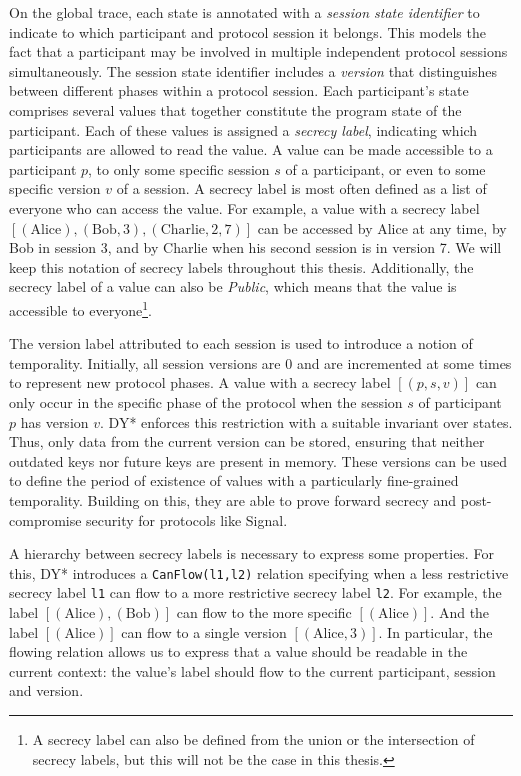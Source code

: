 On the global trace, each state is annotated with a \emph{session state identifier} to indicate to which participant and protocol session it belongs. This models the fact that a participant may be involved in multiple independent protocol sessions simultaneously. The session state identifier includes a \emph{version} that distinguishes between different phases within a protocol session.%
Each participant's state comprises several values that together constitute the program state of the participant. Each of these values is assigned a \emph{secrecy label}, indicating which participants are allowed to read the value.
A value can be made accessible to a participant $p$, to only some specific session $s$ of a participant, or even to some specific version $v$ of a session.
A secrecy label is most often defined as a list of everyone who can access the value. For example, a value with a secrecy label $[(\text{Alice}), (\text{Bob}, 3), (\text{Charlie}, 2, 7)]$ can be accessed by Alice at any time, by Bob in session 3, and by Charlie when his second session is in version 7. We will keep this notation of secrecy labels throughout this thesis.
Additionally, the secrecy label of a value can also be \emph{Public}, which means that the value is accessible to everyone\footnote{A secrecy label can also be defined from the union or the intersection of secrecy labels, but this will not be the case in this thesis.}.

The version label attributed to each session is used to introduce a notion of temporality. Initially, all session versions are 0 and are incremented at some times to represent new protocol phases.
A value with a secrecy label $[(p,s,v)]$ can only occur in the specific phase of the protocol when the session $s$ of participant $p$ has version $v$.
DY* enforces this restriction with a suitable invariant over states. Thus, only data from the current version can be stored, ensuring that neither outdated keys nor future keys are present in memory.
These versions can be used to define the period of existence of values with a particularly fine-grained temporality.
Building on this, they are able to prove forward secrecy and post-compromise security for protocols like Signal.

A hierarchy between secrecy labels is necessary to express some properties. For this, DY* introduces a \texttt{CanFlow(l1,l2)} relation specifying when a less restrictive secrecy label \texttt{l1} can flow to a more restrictive secrecy label \texttt{l2}.
For example, the label $[(\text{Alice}), (\text{Bob})]$ can flow to the more specific $[(\text{Alice})]$. And the label $[(\text{Alice})]$ can flow to a single version $[(\text{Alice}, 3)]$.
In particular, the flowing relation allows us to express that a value should be readable in the current context: the value's label should flow to the current participant, session and version.

